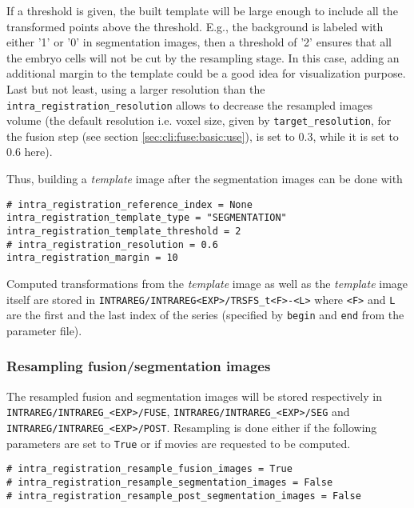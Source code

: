 If a threshold is given, the built template will be large enough to include all the transformed points above the threshold. E.g., the background is labeled with either '1' or '0' in segmentation images, then a threshold of '2' ensures that all the embryo cells will not be cut by the resampling stage.  In this case, adding an additional margin to the template could be a good idea for visualization purpose. Last but not least, using a larger resolution than the \verb|intra_registration_resolution| allows to decrease the resampled images volume (the default resolution i.e. voxel size, given by  \verb|target_resolution|, for the fusion step (see section \ref{sec:cli:fuse:basic:use}), is set to 0.3, while it is set to 0.6 here).

Thus, building a \textit{template} image after the segmentation images can be done with
\begin{verbatim}
# intra_registration_reference_index = None
intra_registration_template_type = "SEGMENTATION"
intra_registration_template_threshold = 2
# intra_registration_resolution = 0.6
intra_registration_margin = 10
\end{verbatim}

Computed transformations from the \textit{template} image as well as the \textit{template} image itself are stored in \verb|INTRAREG/INTRAREG<EXP>/TRSFS_t<F>-<L>| where \verb|<F>| and \verb|L| are the first and the last index of the series (specified by \verb|begin| and \verb|end| from the parameter file).

\subsubsection{Resampling fusion/segmentation images}
\label{sec:cli:intraregistration:resampling}
The resampled fusion and segmentation images will be stored respectively in \verb|INTRAREG/INTRAREG_<EXP>/FUSE|, \verb|INTRAREG/INTRAREG_<EXP>/SEG| and \verb|INTRAREG/INTRAREG_<EXP>/POST|. Resampling is done either if the following parameters are set to \verb|True| or if movies are requested to be computed.

\begin{verbatim}
# intra_registration_resample_fusion_images = True
# intra_registration_resample_segmentation_images = False
# intra_registration_resample_post_segmentation_images = False
\end{verbatim}

